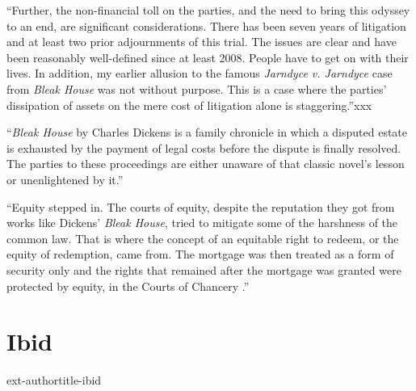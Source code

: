 ``Further, the non-financial toll on the parties, and the need to bring this odyssey to an end, are significant considerations.  There has been seven years of litigation and at least two prior adjournments of this trial.  The issues are clear and have been reasonably well-defined since at least 2008.  People have to get on with their lives.  In addition, my earlier allusion to the famous \textit{Jarndyce v. Jarndyce} case from \textit{Bleak House} was not without purpose.  This is a case where the parties’ dissipation of assets on the mere cost of litigation alone is staggering.''xxx
\bigskip


``\textit{Bleak House} by Charles Dickens is a family chronicle in which a disputed estate is exhausted by the payment of legal costs before the dispute is finally resolved.  The parties to these proceedings are either unaware of that classic novel’s lesson or unenlightened by it.''
\bigskip



``Equity stepped in. The courts of equity, despite the reputation they got from works like Dickens’ \textit{Bleak House}, tried to mitigate some of the harshness of the common law. That is where the concept of an equitable right to redeem, or the equity of redemption, came from. The mortgage was then treated as a form of security only and the rights that remained after the mortgage was granted were protected by equity, in the Courts of Chancery .''





\section{Ibid}
ext-authortitle-ibid

